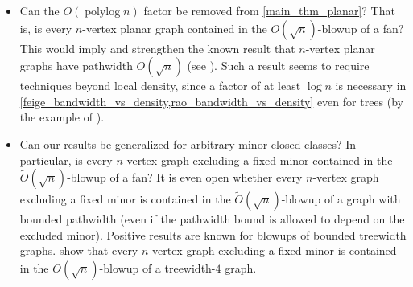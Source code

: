 \documentclass{patmorin}
\newcommand{\david}[1]{{\color{orange} David: #1}}
\newcommand{\pat}[1]{\textcolor{Blue}{Pat: #1}}
\DeclareMathOperator{\polylog}{polylog}
\begin{document}
\begin{itemize}
\item Can the $O(\polylog n)$ factor be removed from \cref{main_thm_planar}? That is, is every $n$-vertex planar graph contained in the $O(\sqrt{n})$-blowup of a fan? This would imply and strengthen the known result that $n$-vertex planar graphs have pathwidth $O(\sqrt{n})$ (see \citep{Bodlaender98}). Such a result seems to require techniques beyond local density, since a factor of at least $\log n$ is necessary in
\cref{feige_bandwidth_vs_density,rao_bandwidth_vs_density}  even for trees (by the example of \citet{chvatalova:on}).  




\item Can our results be generalized for arbitrary minor-closed classes? In particular, is every $n$-vertex  graph excluding a fixed minor contained in the $\tilde{O}(\sqrt{n})$-blowup of a fan? It is even open  whether every $n$-vertex graph excluding a fixed minor is contained in the $\tilde{O}(\sqrt{n})$-blowup of a graph with bounded pathwidth (even if the pathwidth bound is allowed to depend on the excluded minor).  Positive results are known for blowups of bounded treewidth graphs. \citet{distel.dujmovic.ea:product} show that every $n$-vertex graph excluding a fixed minor is contained in the $O(\sqrt{n})$-blowup of a treewidth-$4$ graph.
\end{itemize}
\end{document}

